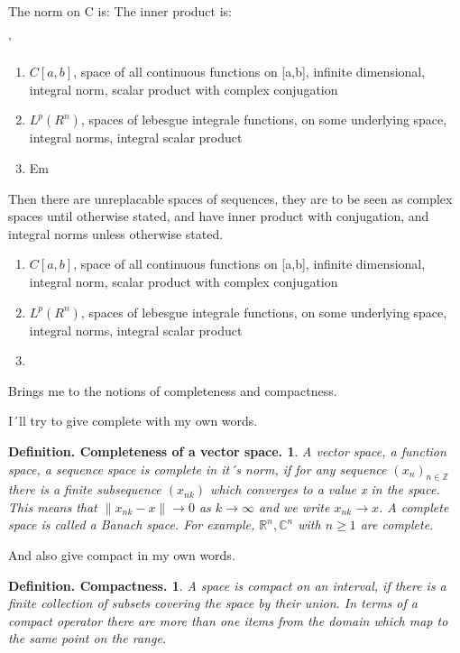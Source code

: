 \documentclass[a4paper]{article}
\begin{document}
The norm on C is:
The inner product is:


'\begin{enumerate}
\label{common_function_spaces}
\item $C[a,b]$, space of all continuous functions on [a,b], infinite dimensional, integral norm, scalar product with complex conjugation
\item $L^p(R^n)$, spaces of lebesgue integrale functions, on some underlying space, integral norms, integral scalar product
\item
Em\end{enumerate}

Then there are unreplacable spaces of sequences, they are to be seen as complex spaces until otherwise stated, and have inner product with conjugation, and integral norms unless otherwise stated.

\begin{enumerate}
\label{common_function_spaces}
\item $C[a,b]$, space of all continuous functions on [a,b], infinite dimensional, integral norm, scalar product with complex conjugation
\item $L^p(R^n)$, spaces of lebesgue integrale functions, on some underlying space, integral norms, integral scalar product
\item
\end{enumerate}


Brings me to the notions of completeness and compactness.

I´ll try to give complete with my own words.

\newtheorem{Completeness}{Definition. Completeness of a vector space.}
\begin{Completeness}
A vector space, a function space, a sequence space is complete in it´s norm, if for any sequence $(x_n)_{n\in \mathbb{Z}}$ there is a finite subsequence $(x_{nk})$ which converges to a value x in the space. This means that $\|x_{nk}-x\| \rightarrow 0$ as $k \rightarrow \infty$ and we write $x_{nk}\rightarrow x$. A complete space is called a Banach space. For example, $\mathbb{R}^{n}, \mathbb{C}^{n}$ with $n\geq1$ are complete.
\end{Completeness}

And also give compact in my own words.

\newtheorem{Compactness}{Definition. Compactness.}
\begin{Compactness}
A space is compact on an interval, if there is a finite collection of subsets covering the space by their union. In terms of a compact operator there are more than one items from the domain which map to the same point on the range.
\end{Compactness}
\end{document}
